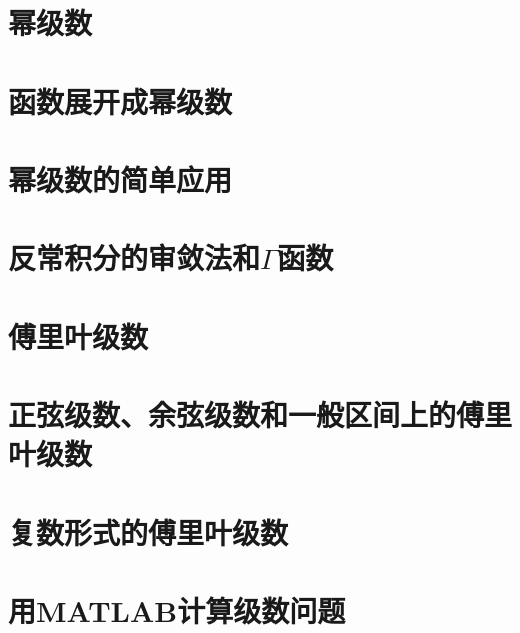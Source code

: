 \section{幂级数}

\section{函数展开成幂级数}

\section{幂级数的简单应用}

\section{反常积分的审敛法和$\Gamma$函数}

\section{傅里叶级数}

\section{正弦级数、余弦级数和一般区间上的傅里叶级数}

\section{复数形式的傅里叶级数}

\section{用MATLAB计算级数问题}



